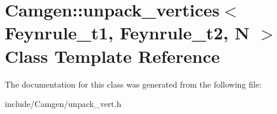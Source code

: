 \hypertarget{a00555}{\section{Camgen\-:\-:unpack\-\_\-vertices$<$ Feynrule\-\_\-t1, Feynrule\-\_\-t2, N $>$ Class Template Reference}
\label{a00555}
}


The documentation for this class was generated from the following file\-:\begin{DoxyCompactItemize}
\item 
include/\-Camgen/unpack\-\_\-vert.\-h\end{DoxyCompactItemize}
